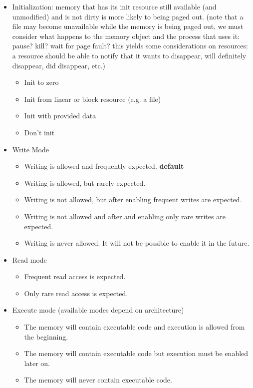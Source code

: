 \documentclass[a4paper]{article}
\begin{document}
\begin{itemize}
\begin{itemize}
\begin{itemize}
  \item Initialization: memory that has its init resource still available (and unmodified) and is not dirty is more likely to being paged out. (note that a file may become unavailable while the memory is being paged out, we must consider what happens to the memory object and the process that uses it: pause? kill? wait for page fault? this yields some considerations on resources: a resource should be able to notify that it wants to disappear, will definitely disappear, did disappear, etc.)
    \begin{itemize}
      \item Init to zero
      \item Init from linear or block resource (e.g. a file)
      \item Init with provided data
      \item Don't init
    \end{itemize}
  \item Write Mode
    \begin{itemize}
      \item Writing is allowed and frequently expected. {\bf default}
      \item Writing is allowed, but rarely expected.
      \item Writing is not allowed, but after enabling frequent writes are expected.
      \item Writing is not allowed and after and enabling only rare writes are expected.
      \item Writing is never allowed. It will not be possible to enable it in the future.
    \end{itemize}
  \item Read mode
    \begin{itemize}
      \item Frequent read access is expected.
      \item Only rare read access is expected.
    \end{itemize}
  \item Execute mode (available modes depend on architecture)
    \begin{itemize}
      \item The memory will contain executable code and execution is allowed from the beginning.
      \item The memory will contain executable code but execution must be enabled later on.
      \item The memory will never contain executable code.

\end{itemize}
\end{itemize}
\end{itemize}
\end{itemize}
\end{document}
